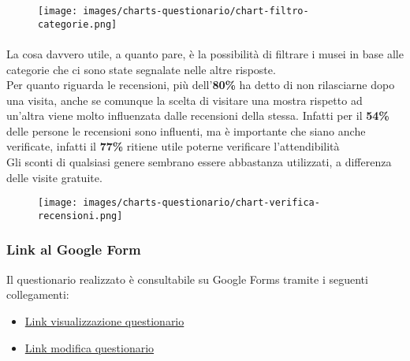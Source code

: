 \begin{figure}[ht]
    \centering
    \texttt{[image: images/charts-questionario/chart-filtro-categorie.png]}
\end{figure}

\paragraph{}
La cosa davvero utile, a quanto pare, è la possibilità di filtrare i musei in base alle categorie che ci sono state segnalate nelle altre risposte.\\
Per quanto riguarda le recensioni, più dell'\textbf{80\%} ha detto di non rilasciarne dopo una visita, anche se comunque la scelta di visitare una mostra rispetto ad un'altra viene molto influenzata dalle recensioni della stessa. Infatti per il \textbf{54\%} delle persone le recensioni sono influenti, ma è importante che siano anche verificate, infatti il \textbf{77\%} ritiene utile poterne verificare l'attendibilità\\
Gli sconti di qualsiasi genere sembrano essere abbastanza utilizzati, a differenza delle visite gratuite.

\begin{figure}[ht]
    \centering
    \texttt{[image: images/charts-questionario/chart-verifica-recensioni.png]}
\end{figure}

\subsubsection{Link al Google Form}
Il questionario realizzato è consultabile su Google Forms tramite i seguenti collegamenti:
\begin{itemize}
    \item \href{https://docs.google.com/forms/d/e/1FAIpQLSffQU5PqOGo93X0QrQbD5VscMGA07pes3RWkuZRolinX4nevg/viewform}{Link visualizzazione questionario}
    \item \href{https://docs.google.com/forms/u/1/d/1vKzFGCQb5nvyG6it8HfEqZgZ3ioQ6J1_T6eUiTdYIRc/edit?usp=redirect_edit_quantum}{Link modifica questionario}
\end{itemize}